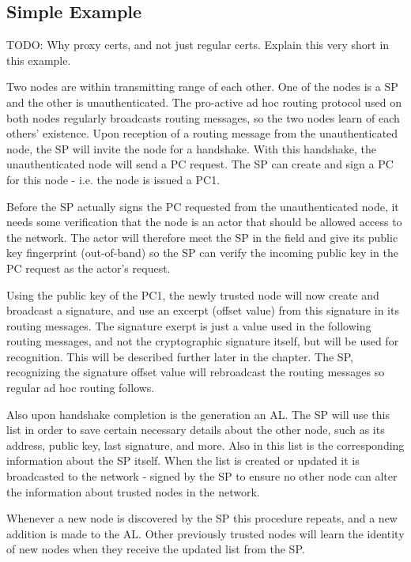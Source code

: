\subsection{Simple Example}
TODO: Why proxy certs, and not just regular certs. Explain this very short in
this example.

Two nodes are within transmitting range of each other. One of the
nodes is a \ac{SP} and the other is unauthenticated. The pro-active ad hoc
routing protocol used on both nodes regularly broadcasts routing messages, so
the two nodes learn of each others' existence. Upon reception of a routing
message from the unauthenticated node, the \ac{SP} will invite the node for a
handshake. With this handshake, the unauthenticated node will send a \ac{PC}
request. The \ac{SP} can create and sign a \ac{PC} for this node - i.e. the node
is issued a \ac{PC1}.

Before the \ac{SP} actually signs the \ac{PC} requested from the unauthenticated
node, it needs some verification that the node is an actor that should be
allowed access to the network. The actor will therefore meet the \ac{SP} in the
field and give its public key fingerprint (out-of-band) so the \ac{SP} can
verify the incoming public key in the \ac{PC} request as the actor's request.

Using the public key of the \ac{PC1}, the newly trusted node will now create and 
broadcast a signature, and use an excerpt (offset value) from this signature
in its routing messages. The signature exerpt is just a value used in the
following routing messages, and not the cryptographic signature itself, but
will be used for recognition. This will be described further later in the
chapter. The \ac{SP}, recognizing the signature offset value will rebroadcast
the routing messages so regular ad hoc routing follows.

Also upon handshake completion is the generation an \ac{AL}. The \ac{SP} will
use this list in order to save certain necessary details about the other node,
such as its address, public key, last signature, and more. Also in this list is
the corresponding information about the \ac{SP} itself. When the list is created
or updated it is broadcasted to the network - signed by the \ac{SP} to ensure no
other node can alter the information about trusted nodes in the network.

Whenever a new node is discovered by the \ac{SP} this procedure repeats, and a
new addition is made to the \ac{AL}. Other previously trusted nodes will learn
the identity of new nodes when they receive the updated list from the \ac{SP}.

